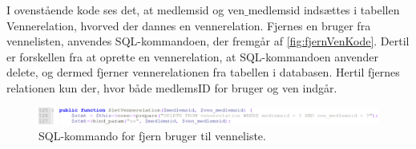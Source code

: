 I ovenstående kode ses det, at medlemsid og ven$\_$medlemsid indsættes i tabellen Vennerelation, hvorved der dannes en vennerelation. Fjernes en bruger fra vennelisten, anvendes SQL-kommandoen, der fremgår af \autoref{fig:fjernVenKode}. Dertil er forskellen fra at oprette en vennerelation, at SQL-kommandoen anvender delete, og dermed fjerner vennerelationen fra tabellen i databasen. Hertil fjernes relationen kun der, hvor både medlemsID for bruger og ven indgår. 

\begin{figure} [H]
\centering
\includegraphics[width=1\textwidth]{figures/imple/fjernVenKode}
\caption{SQL-kommando for fjern bruger til venneliste.}
\label{fig:fjernVenKode}
\end{figure}

